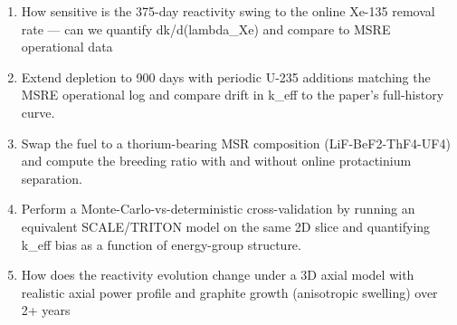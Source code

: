 \begin{enumerate}[leftmargin=1.6em,itemsep=0.2em,topsep=0.2em,label=Q\arabic*.]
\item How sensitive is the 375-day reactivity swing to the online Xe-135 removal rate --- can we quantify dk/d(lambda\_Xe) and compare to MSRE operational data
\item Extend depletion to 900 days with periodic U-235 additions matching the MSRE operational log and compare drift in k\_eff to the paper's full-history curve.
\item Swap the fuel to a thorium-bearing MSR composition (LiF-BeF2-ThF4-UF4) and compute the breeding ratio with and without online protactinium separation.
\item Perform a Monte-Carlo-vs-deterministic cross-validation by running an equivalent SCALE/TRITON model on the same 2D slice and quantifying k\_eff bias as a function of energy-group structure.
\item How does the reactivity evolution change under a 3D axial model with realistic axial power profile and graphite growth (anisotropic swelling) over 2+ years
\end{enumerate}

